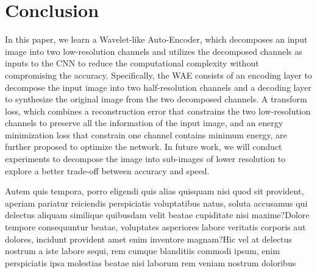 \documentclass[letterpaper]{article} %
\begin{document}
\vspace{-1.57mm}
\section{Conclusion}
In this paper, we learn a Wavelet-like Auto-Encoder, which decomposes an input image into two low-resolution channels and utilizes the decomposed channels as inputs to the CNN to reduce the computational complexity without compromising the accuracy. Specifically, the WAE consists of an encoding layer to decompose the input image into two half-resolution channels and a decoding layer to synthesize the original image from the two decomposed channels. A transform loss, which combines a reconstruction error that constrains the two low-resolution channels to preserve all the information of the input image, and an energy minimization loss that constrain one channel contains minimum energy, are further proposed to optimize the network.
In future work, we will conduct experiments to decompose the image into sub-images of lower resolution to explore a better trade-off between accuracy and speed.


Autem quis tempora, porro eligendi quis alias quisquam nisi quod sit provident, aperiam pariatur reiciendis perspiciatis voluptatibus natus, soluta accusamus qui delectus aliquam similique quibusdam velit beatae cupiditate nisi maxime?Dolore tempore consequuntur beatae, voluptates asperiores labore veritatis corporis aut dolores, incidunt provident amet enim inventore magnam?Hic vel at delectus nostrum a iste labore sequi, rem cumque blanditiis commodi ipsum, enim perspiciatis ipsa molestias beatae nisi laborum rem veniam nostrum doloribus

\end{document}
